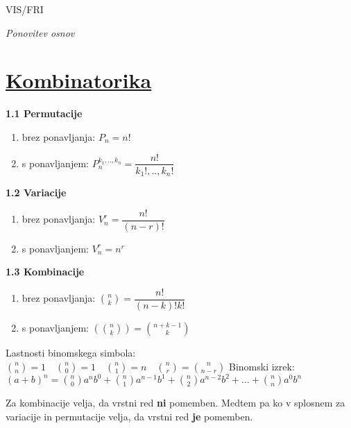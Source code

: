 \documentclass{article}
\begin{document}
\begin{center}
	{\small VIS/FRI \par}
\end{center}

\begin{multicols}{3}

	\textit{Ponovitev osnov}

	\section{\underline{Kombinatorika}}


	\textbf{1.1 Permutacije}
	\begin{enumerate}
		\item brez ponavljanja: $P_{n} = n!$
		\item s ponavljanjem: $P_{n}^{k_{1},..,k_{n}} = \dfrac{n!}{k_{1}!,..,k_{n}!}$
	\end{enumerate}

	\textbf{1.2 Variacije}
	\begin{enumerate}
		\item brez ponavljanja: $V_{n}^{r} = \dfrac{n!}{(n - r)!}$
		\item s ponavljanjem: $V_{n}^{r} = n^{r}$
	\end{enumerate}

	\textbf{1.3 Kombinacije}
	\begin{enumerate}
		\item brez ponavljanja: ${n\choose k} = \dfrac{n!}{(n - k)! k!}$
		\item s ponavljanjem: $({n\choose k}) = {n + k - 1\choose k}$
	\end{enumerate}
	\begin{center}
		Lastnosti binomskega simbola:
		\begin{math}
			{n \choose n} = 1 \quad
			{n \choose 0} = 1 \quad
			{n \choose 1} = n \quad
			{n \choose r} = {n \choose n - r}
		\end{math}
		Binomski izrek:\\
		\begin{math}
			(a + b)^{n} =
				{n \choose 0} a^{n} b^{0} + {n \choose 1} a^{n - 1} b^{1} +
			{n \choose 2} a^{n - 2} b^{2} + \dots + {n \choose n} a^{0} b^{n}
		\end{math}

	\end{center}
	Za kombinacije velja, da vrstni red \textbf{ni} pomemben. Medtem pa
	ko v splosnem za variacije in permutacije velja, da vrstni red \textbf{je}
	pomemben.


\end{multicols}
\end{document}
